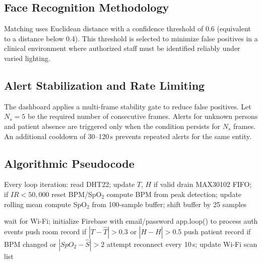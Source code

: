 \subsection{Face Recognition Methodology}
Matching uses Euclidean distance with a confidence threshold of 0.6 (equivalent to a distance below 0.4). This threshold is selected to minimize false positives in a clinical environment where authorized staff must be identified reliably under varied lighting.

\subsection{Alert Stabilization and Rate Limiting}
The dashboard applies a multi-frame stability gate to reduce false positives. Let $N_s = 5$ be the required number of consecutive frames. Alerts for unknown persons and patient absence are triggered only when the condition persists for $N_s$ frames. An additional cooldown of 30--120\,s prevents repeated alerts for the same entity.

\subsection{Algorithmic Pseudocode}

\begin{algorithm}[H]
\caption{ESP32 sensor update loop (Core 1)}
\begin{algorithmic}[1]
\STATE Every loop iteration:
	\STATE read DHT22; update $T$, $H$ if valid
\ENDIF
\STATE drain MAX30102 FIFO; if $IR < 50{,}000$ reset BPM/SpO$_2$
\STATE compute BPM from peak detection; update rolling mean
\STATE compute SpO$_2$ from 100-sample buffer; shift buffer by 25 samples
\end{algorithmic}
\end{algorithm}

\begin{algorithm}[H]
\caption{Firebase upload task (Core 0)}
\begin{algorithmic}[1]
\STATE wait for Wi-Fi; initialize Firebase with email/password
\LOOP
	\STATE app.loop() to process auth events
			\STATE push room record if $|T-\hat{T}|>0.3$ or $|H-\hat{H}|>0.5$
			\STATE push patient record if BPM changed or $|SpO_2-\hat{S}|>2$
		\ENDIF
	\ELSE
		\STATE attempt reconnect every 10\,s; update Wi-Fi scan list
	\ENDIF
\ENDLOOP
\end{algorithmic}
\end{algorithm}


